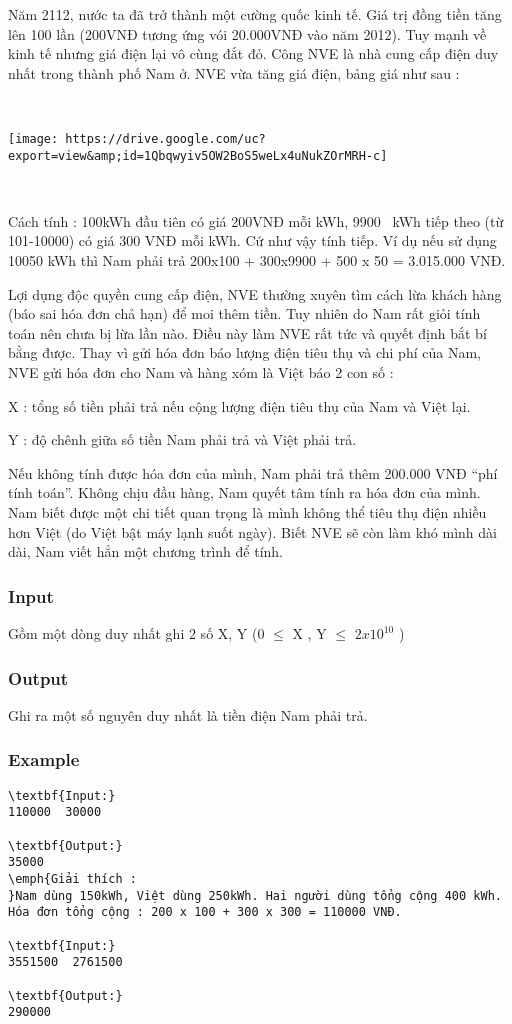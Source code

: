 

Năm 2112, nước ta đã trở thành một cường quốc kinh tế. Giá trị đồng tiền tăng lên 100 lần (200VNĐ tương ứng vói 20.000VNĐ vào năm 2012). Tuy mạnh về kinh tế nhưng giá điện lại vô cùng đắt đỏ. Công NVE là nhà cung cấp điện duy nhất trong thành phố Nam ở. NVE vừa tăng giá điện, bảng giá như sau :

 


\texttt{[image: https://drive.google.com/uc?export=view\&amp;id=1Qbqwyiv5OW2BoS5weLx4uNukZOrMRH-c]}

 

Cách tính : 100kWh đầu tiên có giá 200VNĐ mỗi kWh, 9900  kWh tiếp theo (từ 101-10000) có giá 300 VNĐ mỗi kWh. Cứ như vậy tính tiếp. Ví dụ nếu sử dụng 10050 kWh thì Nam phải trả 200x100 + 300x9900 + 500 x 50 = 3.015.000 VNĐ.

Lợi dụng độc quyền cung cấp điện, NVE thường xuyên tìm cách lừa khách hàng (báo sai hóa đơn chả hạn) để moi thêm tiền. Tuy nhiên do Nam rất giỏi tính toán nên chưa bị lừa lần nào. Điều này làm NVE rất tức và quyết định bắt bí bằng được. Thay vì gửi hóa đơn báo lượng điện tiêu thụ và chi phí của Nam, NVE gửi hóa đơn cho Nam và hàng xóm là Việt báo 2 con số :

X : tổng số tiền phải trả nếu cộng lượng điện tiêu thụ của Nam và Việt lại.


Y : độ chênh giữa số tiền Nam phải trả và Việt phải trả.

Nếu không tính được hóa đơn của mình, Nam phải trả thêm 200.000 VNĐ “phí tính toán”. Không chịu đầu hàng, Nam quyết tâm tính ra hóa đơn của mình. Nam biết được một chi tiết quan trọng là mình không thể tiêu thụ điện nhiều hơn Việt (do Việt bật máy lạnh suốt ngày). Biết NVE sẽ còn làm khó mình dài dài, Nam viết hẳn một chương trình để tính.

\subsubsection{Input}

Gồm một dòng duy nhất ghi 2 số X, Y (0  $\le$  X , Y $\le$  $2x10^{10}$ )

\subsubsection{Output}

Ghi ra một số nguyên duy nhất là tiền điện Nam phải trả.

\subsubsection{Example}
\begin{verbatim}
\textbf{Input:}
110000  30000

\textbf{Output:}
35000
\emph{Giải thích : 
}Nam dùng 150kWh, Việt dùng 250kWh. Hai người dùng tổng cộng 400 kWh. 
Hóa đơn tổng cộng : 200 x 100 + 300 x 300 = 110000 VNĐ.

\textbf{Input:}
3551500  2761500

\textbf{Output:}
290000

\end{verbatim}


